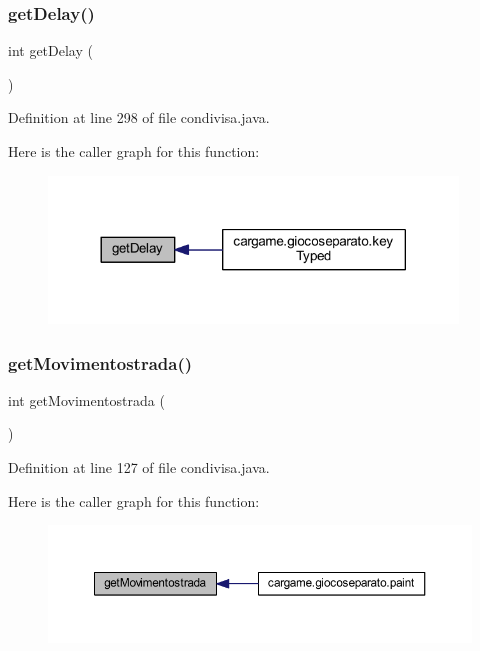 \subsubsection{\texorpdfstring{get\+Delay()}{getDelay()}}
{\footnotesize\ttfamily int get\+Delay (\begin{DoxyParamCaption}{ }\end{DoxyParamCaption})}



Definition at line 298 of file condivisa.\+java.

Here is the caller graph for this function\+:
\nopagebreak
\begin{figure}[H]
\begin{center}
\leavevmode
\includegraphics[width=308pt]{classcargame_1_1condivisa_ab3d3f2281e778ff0b69ac11dddd092b4_icgraph}
\end{center}
\end{figure}
\mbox{\label{classcargame_1_1condivisa_ae81960e9152c97ef612f172f8ea2d68d}} 
\subsubsection{\texorpdfstring{get\+Movimentostrada()}{getMovimentostrada()}}
{\footnotesize\ttfamily int get\+Movimentostrada (\begin{DoxyParamCaption}{ }\end{DoxyParamCaption})}



Definition at line 127 of file condivisa.\+java.

Here is the caller graph for this function\+:
\nopagebreak
\begin{figure}[H]
\begin{center}
\leavevmode
\includegraphics[width=350pt]{classcargame_1_1condivisa_ae81960e9152c97ef612f172f8ea2d68d_icgraph}
\end{center}
\end{figure}
\mbox{\label{classcargame_1_1condivisa_ae2d024d6283b37c1e717238ba1c36909}} 
